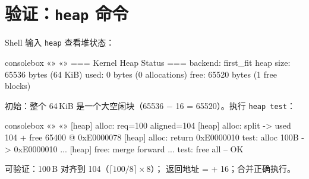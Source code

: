 \section{验证：\texttt{heap} 命令}

Shell 输入 \texttt{heap} 查看堆状态：

\begin{tcblisting}{consolebox}
«\tpk{>}» «»
=== Kernel Heap Status ===
  backend:     first_fit
  heap size:   65536 bytes (64 KiB)
  used:        0 bytes (0 allocations)
  free:        65520 bytes (1 free blocks)
\end{tcblisting}

初始：整个 64\,KiB 是一个大空闲块（65536 $-$ 16 = 65520）。执行 \texttt{heap test}：

\begin{tcblisting}{consolebox}
«\tpk{>}» «»
[heap] alloc: req=100 aligned=104
[heap] alloc: split -> used 104 + free 65400 @ 0xE0000078
[heap] alloc: return 0xE0000010
test: alloc 100B -> 0xE0000010
...
[heap] free: merge forward ...
test: free all -- OK
\end{tcblisting}

可验证：100\,B 对齐到 104（$\lceil 100/8 \rceil \times 8$）；
返回地址 =  + 16；合并正确执行。


